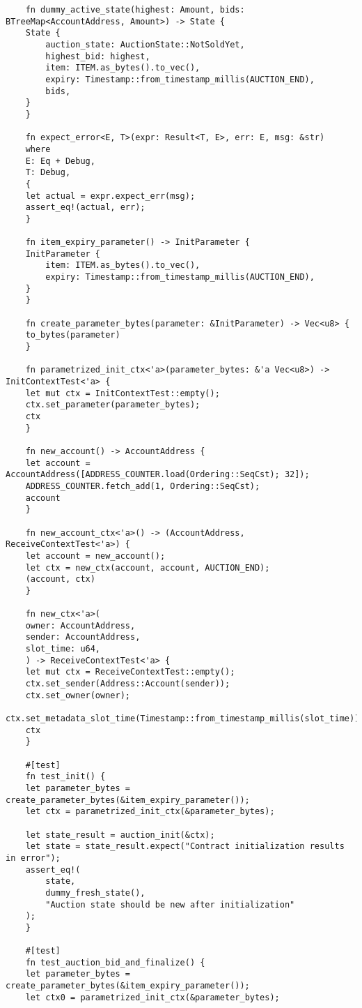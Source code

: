 \documentclass[11pt]{article}
\begin{document}
\begin{verbatim}
    fn dummy_active_state(highest: Amount, bids: BTreeMap<AccountAddress, Amount>) -> State {
	State {
	    auction_state: AuctionState::NotSoldYet,
	    highest_bid: highest,
	    item: ITEM.as_bytes().to_vec(),
	    expiry: Timestamp::from_timestamp_millis(AUCTION_END),
	    bids,
	}
    }

    fn expect_error<E, T>(expr: Result<T, E>, err: E, msg: &str)
    where
	E: Eq + Debug,
	T: Debug,
    {
	let actual = expr.expect_err(msg);
	assert_eq!(actual, err);
    }

    fn item_expiry_parameter() -> InitParameter {
	InitParameter {
	    item: ITEM.as_bytes().to_vec(),
	    expiry: Timestamp::from_timestamp_millis(AUCTION_END),
	}
    }

    fn create_parameter_bytes(parameter: &InitParameter) -> Vec<u8> {
	to_bytes(parameter)
    }

    fn parametrized_init_ctx<'a>(parameter_bytes: &'a Vec<u8>) -> InitContextTest<'a> {
	let mut ctx = InitContextTest::empty();
	ctx.set_parameter(parameter_bytes);
	ctx
    }

    fn new_account() -> AccountAddress {
	let account = AccountAddress([ADDRESS_COUNTER.load(Ordering::SeqCst); 32]);
	ADDRESS_COUNTER.fetch_add(1, Ordering::SeqCst);
	account
    }

    fn new_account_ctx<'a>() -> (AccountAddress, ReceiveContextTest<'a>) {
	let account = new_account();
	let ctx = new_ctx(account, account, AUCTION_END);
	(account, ctx)
    }

    fn new_ctx<'a>(
	owner: AccountAddress,
	sender: AccountAddress,
	slot_time: u64,
    ) -> ReceiveContextTest<'a> {
	let mut ctx = ReceiveContextTest::empty();
	ctx.set_sender(Address::Account(sender));
	ctx.set_owner(owner);
	ctx.set_metadata_slot_time(Timestamp::from_timestamp_millis(slot_time));
	ctx
    }

    #[test]
    fn test_init() {
	let parameter_bytes = create_parameter_bytes(&item_expiry_parameter());
	let ctx = parametrized_init_ctx(&parameter_bytes);

	let state_result = auction_init(&ctx);
	let state = state_result.expect("Contract initialization results in error");
	assert_eq!(
	    state,
	    dummy_fresh_state(),
	    "Auction state should be new after initialization"
	);
    }

    #[test]
    fn test_auction_bid_and_finalize() {
	let parameter_bytes = create_parameter_bytes(&item_expiry_parameter());
	let ctx0 = parametrized_init_ctx(&parameter_bytes);


\end{verbatim}
\end{document}
